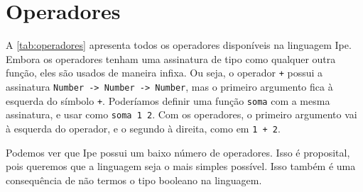 \section{Operadores}

A \autoref{tab:operadores} apresenta todos os operadores disponíveis na
linguagem Ipe. Embora os operadores tenham uma assinatura de tipo como qualquer
outra função, eles são usados de maneira infixa. Ou seja, o operador \texttt{+}
possui a assinatura \texttt{Number -> Number -> Number}, mas o primeiro argumento
fica à esquerda do símbolo \texttt{+}. Poderíamos definir uma função
\texttt{soma} com a mesma assinatura, e usar como \texttt{soma 1 2}. Com os
operadores, o primeiro argumento vai à esquerda do operador, e o segundo à direita,
como em \texttt{1 + 2}.

\begin{table}[htb]
    \caption[Operadores em Ipe]{Operadores em Ipe}
    \label{tab:operadores}
\end{table}

Podemos ver que Ipe possui um baixo número de operadores. Isso é proposital, pois
queremos que a linguagem seja o mais simples possível. Isso também é uma consequência
de não termos o tipo booleano na linguagem.

